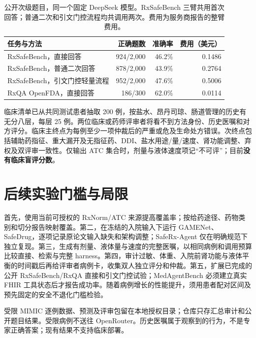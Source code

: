\documentclass[UTF8,11pt,a4paper]{ctexart}
\begin{document}
\begin{table}[t]
\centering\small
\caption{公开次级题目，同一个固定 DeepSeek 模型。RxSafeBench 三臂共用首次回答；普通二次和引文门控流程均共调用两次。费用为服务商报告的整臂费用。}
\label{tab:public}
\begin{tabular}{@{}p{5.8cm}rrr@{}}
\toprule
任务与方法 & 正确题数 & 准确率 & 费用（美元） \\
\midrule
RxSafeBench，直接回答 & 924/2,000 & 46.2\% & 0.1486 \\
RxSafeBench，普通二次回答 & 878/2,000 & 43.9\% & 0.2764 \\
RxSafeBench，引文门控轻量流程 & 952/2,000 & 47.6\% & 0.5006 \\
RxQA OpenFDA，直接回答 & 186/300 & 62.0\% & 0.0114 \\
\bottomrule
\end{tabular}
\end{table}

临床清单已从共同测试患者抽取 200 例，按盐水、昂丹司琼、肠道管理的历史有无分八层，每层 25 例。两位临床或药师评审者将看不到方法身份、历史医嘱和对方评分。临床主终点为每例至少一项仲裁后的严重或危及生命处方错误。次终点包括辅助药指征、重大漏开及无指征药、DDI、盐水用途/量/速度、肾功能调整、弃权及双评审一致性。仅输出 ATC 集合时，剂量与液体速度项记“不可评”；目前\textbf{没有临床盲评分数}。

\section{后续实验门槛与局限}
首先，使用当前可授权的 RxNorm/ATC 来源提高覆盖率；按给药途径、药物类别和切分报告映射覆盖。第二，在冻结的入院输入下运行 GAMENet、SafeDrug，逐项记录原论文输入缺失和架构调整；SafeRx-Agent 仅在明确规范下独立复现。第三，生成有剂量、液体量与速度的完整医嘱，以相同病例和调用预算比较直接、检索与完整 harness。第四，审计过敏、体重、入院前肾功能与液体平衡的时间戳后再给评审者病例卡，收集双人独立评分和仲裁。第五，扩展已完成的公开 RxSafeBench/RxQA 直接和引文门控试验；MedAgentBench 必须建立真实 FHIR 工具状态后才报告成功率。随着病例增长的性能提升，须用患者配对区间及预先固定的安全不退化门槛检验。

受限 MIMIC 逐例数据、预测及评审包留在本地授权目录；仓库只存汇总审计和公开题目结果。受限病例不送往 OpenRouter。历史医嘱属于观察到的行为，不是专家正确答案；现有结果不支持临床部署。
\end{document}
